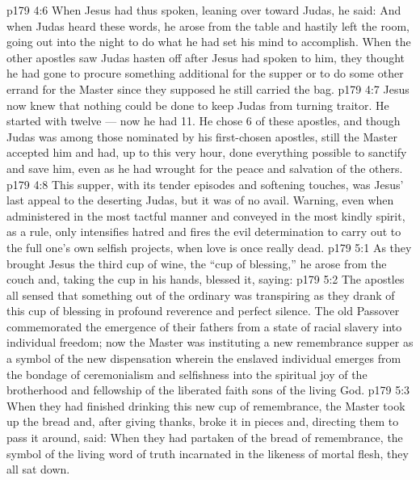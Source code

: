 \vs p179 4:6 When Jesus had thus spoken, leaning over toward Judas, he said:  And when Judas heard these words, he arose from the table and hastily left the room, going out into the night to do what he had set his mind to accomplish. When the other apostles saw Judas hasten off after Jesus had spoken to him, they thought he had gone to procure something additional for the supper or to do some other errand for the Master since they supposed he still carried the bag.
\vs p179 4:7 \pc Jesus now knew that nothing could be done to keep Judas from turning traitor. He started with twelve --- now he had 11. He chose 6 of these apostles, and though Judas was among those nominated by his first\hyp{}chosen apostles, still the Master accepted him and had, up to this very hour, done everything possible to sanctify and save him, even as he had wrought for the peace and salvation of the others.
\vs p179 4:8 This supper, with its tender episodes and softening touches, was Jesus’ last appeal to the deserting Judas, but it was of no avail. Warning, even when administered in the most tactful manner and conveyed in the most kindly spirit, as a rule, only intensifies hatred and fires the evil determination to carry out to the full one’s own selfish projects, when love is once really dead.
\vs p179 5:1 As they brought Jesus the third cup of wine, the “cup of blessing,” he arose from the couch and, taking the cup in his hands, blessed it, saying: 
\vs p179 5:2 The apostles all sensed that something out of the ordinary was transpiring as they drank of this cup of blessing in profound reverence and perfect silence. The old Passover commemorated the emergence of their fathers from a state of racial slavery into individual freedom; now the Master was instituting a new remembrance supper as a symbol of the new dispensation wherein the enslaved individual emerges from the bondage of ceremonialism and selfishness into the spiritual joy of the brotherhood and fellowship of the liberated faith sons of the living God.
\vs p179 5:3 When they had finished drinking this new cup of remembrance, the Master took up the bread and, after giving thanks, broke it in pieces and, directing them to pass it around, said:  When they had partaken of the bread of remembrance, the symbol of the living word of truth incarnated in the likeness of mortal flesh, they all sat down.
